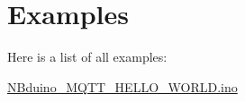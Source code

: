 \section{Examples}
Here is a list of all examples\+:\begin{DoxyCompactItemize}
\item 
\mbox{\hyperlink{_n_bduino__m_q_t_t__h_e_l_l_o__w_o_r_l_d_8ino-example}{N\+Bduino\+\_\+\+M\+Q\+T\+T\+\_\+\+H\+E\+L\+L\+O\+\_\+\+W\+O\+R\+L\+D.\+ino}}
\end{DoxyCompactItemize}
